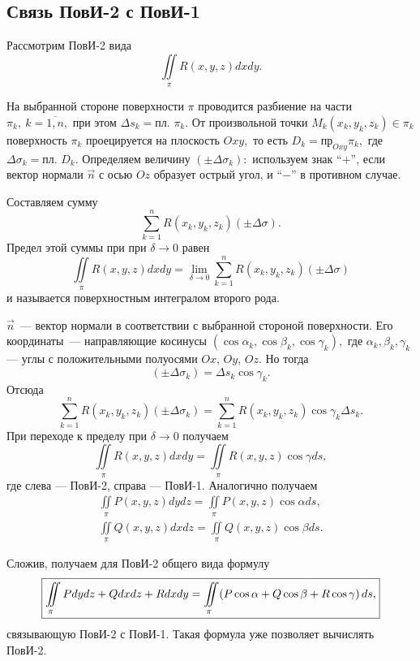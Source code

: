 \documentclass[../../main.tex]{subfiles}
\begin{document}
\subsection{Связь ПовИ-2 с ПовИ-1}

Рассмотрим ПовИ-2 вида \[\iint\limits_\pi R(x, y, z)dxdy.\]

На выбранной стороне поверхности $\pi$ проводится разбиение на части $\pi_k,\
 k=\overline{1,n},$ при этом $\Delta s_k =\text{пл. }\pi_k.$
От произвольной точки $M_k(x_k, y_k, z_k)\in\pi_k$ поверхность $\pi_k$ 
проецируется на плоскость $Oxy,$ то есть $D_k = \text{пр}_{Oxy} \pi_k,$ где
 $\Delta\sigma_k = \text{пл. }D_k.$
Определяем величину $(\pm\Delta\sigma_k):$ 
используем знак ``$+$'', если вектор нормали $\vec{n}$ с осью $Oz$ образует
 острый угол, и ``$-$'' в противном случае.

Составляем сумму \[\sum\limits_{k=1}^n R(x_k, y_k, z_k)(\pm\Delta\sigma).\] Предел этой суммы при
 при $\delta\rightarrow 0$ равен
\[\iint\limits_\pi R(x, y, z)dxdy = \lim_{\delta\rightarrow 0}\sum\limits_{k=1}^n
R(x_k, y_k, z_k)(\pm \Delta\sigma)\] и
называется поверхностным интегралом второго рода.

$\vec n$~--- вектор нормали в соответствии с выбранной стороной поверхности. Его координаты~--- направляющие косинусы $(\cos\alpha_k, \cos\beta_k, \cos\gamma_k),$ где $\alpha_k, 
\beta_k, \gamma_k$ --- углы с положительными полуосями $Ox$, $Oy$, $Oz$. Но тогда
\[(\pm\Delta\sigma_k) = \Delta s_k\cos\gamma_k.\]
Отсюда
\[\sum\limits_{k=1}^n R(x_k, y_k, z_k)(\pm \Delta\sigma_k) = \sum\limits_{k=1}^n 
 R(x_k, y_k, z_k) \cos\gamma_k \Delta s_k.\]
При переходе к пределу при $\delta\rightarrow 0$ получаем
\[\iint\limits_\pi R(x, y, z)dxdy = \iint\limits_\pi R(x, y, z) 
\cos\gamma ds,\] где слева --- ПовИ-2, справа --- ПовИ-1.
Аналогично получаем \begin{gather*}\iint\limits_\pi P(x, y, z)dydz = \iint\limits_\pi 
P(x, y, z) \cos\alpha ds, \\ \iint\limits_\pi Q(x, y, z)dxdz = \iint\limits_\pi
 Q(x, y, z) \cos\beta ds.\end{gather*}

Сложив, получаем для ПовИ-2 общего вида формулу
\begin{equation}\boxed{\label{lec24, num_1}\iint\limits_\pi Pdydz + Qdxdz + Rdxdy = 
\iint\limits_\pi(P\cos\alpha + Q\cos\beta + R\cos\gamma)\,ds,}\end{equation}
связывающую ПовИ-2 с ПовИ-1. Такая формула уже позволяет вычислять ПовИ-2.
\end{document}
